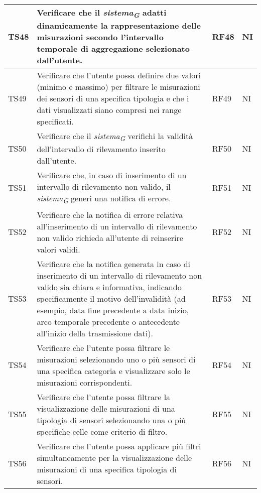 \begin{longtable}{|C{1.9cm}|L{5cm}|C{2cm}|C{2cm}|}
    TS48 & Verificare che il \textit{sistema}\textsubscript{\textit{G}} adatti dinamicamente la rappresentazione delle misurazioni secondo l'intervallo temporale di aggregazione selezionato dall'utente. & RF48 & NI \\
    \hline

    TS49 & Verificare che l'utente possa definire due valori (minimo e massimo) per filtrare le misurazioni dei sensori di una specifica tipologia e che i dati visualizzati siano compresi nei range specificati. & RF49 & NI \\
    \hline

    TS50 & Verificare che il \textit{sistema}\textsubscript{\textit{G}} verifichi la validità dell'intervallo di rilevamento inserito dall'utente. & RF50 & NI \\
    \hline

    TS51 & Verificare che, in caso di inserimento di un intervallo di rilevamento non valido, il \textit{sistema}\textsubscript{\textit{G}} generi una notifica di errore. & RF51 & NI \\
    \hline

    TS52 & Verificare che la notifica di errore relativa all'inserimento di un intervallo di rilevamento non valido richieda all'utente di reinserire valori validi. & RF52 & NI \\
    \hline

    TS53 & Verificare che la notifica generata in caso di inserimento di un intervallo di rilevamento non valido sia chiara e informativa, indicando specificamente il motivo dell'invalidità (ad esempio, data fine precedente a data inizio, arco temporale precedente o antecedente all’inizio della trasmissione dati). & RF53 & NI \\
    \hline

    TS54 & Verificare che l'utente possa filtrare le misurazioni selezionando uno o più sensori di una specifica categoria e visualizzare solo le misurazioni corrispondenti. & RF54 & NI \\
    \hline

    TS55 & Verificare che l'utente possa filtrare la visualizzazione delle misurazioni di una tipologia di sensori selezionando una o più specifiche celle come criterio di filtro. & RF55 & NI \\
    \hline

    TS56 & Verificare che l'utente possa applicare più filtri simultaneamente per la visualizzazione delle misurazioni di una specifica tipologia di sensori. & RF56 & NI \\
    \hline


\end{longtable}
